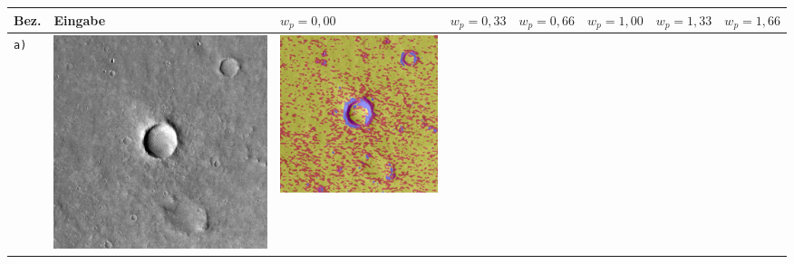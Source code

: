 \begin{table}[h!]
	\setlength\tabcolsep{0pt}
	\begin{tabularx}{\textwidth}{>{\centering}m{}
		>{\centering}m{}
		>{\centering}m{}
		>{\centering}m{}
		>{\centering}m{}
		>{\centering}m{}
		>{\centering}m{}
		>{\centering\arraybackslash}m{}}
	
		\toprule
		Bez. &
		Eingabe & 
		$w_p=0,00$ &
		$w_p=0,33$ &
		$w_p=0,66$ &
		$w_p=1,00$ &
		$w_p=1,33$ &
		$w_p=1,66$ \\
		\midrule
		\texttt{a)} &
		\includegraphics[width=0.9\linewidth]{images/p03/p03_01.png} &
		\includegraphics[width=0.9\linewidth]{images/gen/spatial_weight/p03_01.png_0.00.png} &

\end{tabularx}
\end{table}
